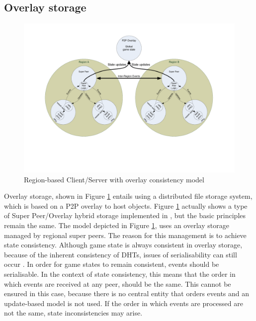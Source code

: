 \documentclass[journal,oneside,a4paper,onecolumn]{IEEEtran}
\begin{document}
\subsection{Overlay storage}
\label{overlay_storage}

\begin{figure}[htbp]
 \centering
 \includegraphics[clip=true, viewport=2cm 5cm 27cm 19.5cm, width=\columnwidth]{region_based_CS_CM_P2PO}
 \caption{Region-based Client/Server with overlay consistency model}
 \label{fig_cs_region_o_cm}
\end{figure}
%
Overlay storage, shown in Figure \ref{fig_cs_region_o_cm} entails using a distributed file storage system, which is based on a P2P overlay to host objects. Figure \ref{fig_cs_region_o_cm} actually shows a type of Super Peer/Overlay hybrid storage implemented in \cite{zoned_federation}, but the basic principles remain the same. The model depicted in Figure \ref{fig_cs_region_o_cm}, uses an overlay storage managed by regional super peers. The reason for this management is to achieve state consistency. Although game state is always consistent in overlay storage, because of the inherent consistency of DHTs, issues of serialisability can still occur \cite{zoned_federation}. In order for game states to remain consistent, events should be serialisable. In the context of state consistency, this means that the order in which events are received at any peer, should be the same. This cannot be ensured in this case, because there is no central entity that orders events and an update-based model is not used. If the order in which events are processed are not the same, state inconsistencies may arise.
\end{document}
